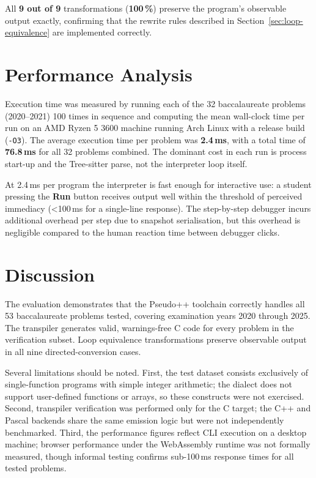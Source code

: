All \textbf{9 out of 9} transformations (\textbf{100\,\%}) preserve the
program's observable output exactly, confirming that the rewrite rules
described in Section~\ref{sec:loop-equivalence} are implemented correctly.

\section{Performance Analysis}
\label{sec:performance}

Execution time was measured by running each of the 32 baccalaureate problems
(2020--2021) 100 times in sequence and computing the mean wall-clock time per
run on an AMD Ryzen 5 3600 machine running Arch Linux with a release build
(\texttt{-O3}).  The average execution time per problem was \textbf{2.4\,ms},
with a total time of \textbf{76.8\,ms} for all 32 problems combined.
The dominant cost in each run is process start-up and the Tree-sitter parse,
not the interpreter loop itself.

At 2.4\,ms per program the interpreter is fast enough for interactive use:
a student pressing the \textbf{Run} button receives output well within the
threshold of perceived immediacy (\textless{}100\,ms for a single-line
response).  The step-by-step debugger incurs additional overhead per step due
to snapshot serialisation, but this overhead is negligible compared to the
human reaction time between debugger clicks.

\section{Discussion}
\label{sec:discussion}

The evaluation demonstrates that the Pseudo++ toolchain correctly handles all
53 baccalaureate problems tested, covering examination years 2020 through
2025.  The transpiler generates valid, warnings-free C code for every problem
in the verification subset.  Loop equivalence transformations preserve
observable output in all nine directed-conversion cases.

Several limitations should be noted.  First, the test dataset consists
exclusively of single-function programs with simple integer arithmetic; the
dialect does not support user-defined functions or arrays, so these
constructs were not exercised.  Second, transpiler
verification was performed only for the C target; the C++ and Pascal backends
share the same emission logic but were not independently benchmarked.  Third,
the performance figures reflect CLI execution on a desktop machine; browser
performance under the WebAssembly runtime was not formally measured, though
informal testing confirms sub-100\,ms response times for all tested problems.
